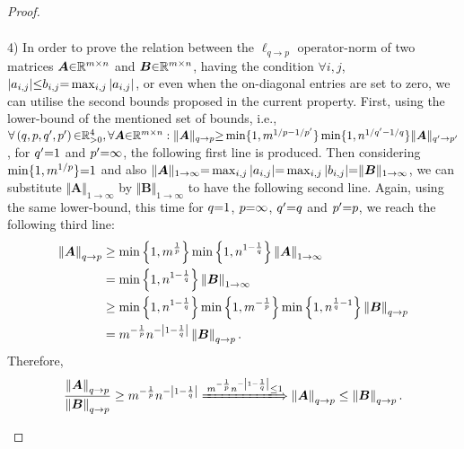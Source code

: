 \begin{proof}
\begin{itemize}
\begin{gather*}
\end{gather*}
4) In order to prove the relation between the $\ell_{q {\to} p}$ operator-norm of two matrices $\boldsymbol{A} {\in} \mathbb{R}^{m {\times} n}$ and $\boldsymbol{B} {\in} \mathbb{R}^{m {\times} n}$, having the condition $\forall i , j$, $|a_{i,j}| {\leq} b_{i,j} {=} \max_{i,j} |a_{i,j}|$, or even when the on-diagonal entries are set to zero, we can utilise the second bounds   proposed in the current property.
First, using the lower-bound of the mentioned set of bounds, i.e., $\forall \left( q , p , q' , p' \right) {\in} \mathbb{R}^4_{>0} , \forall \boldsymbol{A} {\in} \mathbb{R}^{m {\times} n} : \Vert \boldsymbol{A} \Vert_{q \to p} {\geq} \min \{1 , m^{1/p {-} 1/{p'}} \} \min \{1 , n^{1/{q'} {-} 1/q} \} \Vert \boldsymbol{A} \Vert_{q' \to p'}$, for $q' {=} 1$ and $p' {=} \infty$, the following first line is produced.
Then considering $\min \{ 1 , m^{1/p} \} {=} 1$ and also $\Vert \boldsymbol{A} \Vert_{1 \to \infty} {=} \max_{i,j} |a_{i,j}| {=} \max_{i,j} |b_{i,j}| {=} \Vert \boldsymbol{B} \Vert_{1 \to \infty}$, we can substitute $\Vert \boldsymbol{A} \Vert_{1 \to \infty}$ by $\Vert \boldsymbol{B} \Vert_{1 \to \infty}$ to have the following second line.
Again, using the same lower-bound, this time for $q {=} 1$, $p {=} \infty$, $q' {=} q$ and $p' {=} p$, we reach the following third line:
\begin{gather*}
\begin{aligned}
\left\lVert\boldsymbol{A}\right\rVert_{q \to p} &\geq 
\min \left\lbrace 1 , m^{\frac1p} \right\rbrace \min \left\lbrace 1 , n^{1 - \frac1q} \right\rbrace \left\lVert\boldsymbol{A}\right\rVert_{1 \to \infty} \\
&= \min \left\lbrace 1 , n^{1 - \frac1q} \right\rbrace \left\lVert\boldsymbol{B}\right\rVert_{1 \to \infty} \\
&\geq \min \left\lbrace 1 , n^{1 - \frac1q} \right\rbrace \min \left\lbrace 1 , m^{-\frac1p} \right\rbrace \min \left\lbrace 1 , n^{\frac1q - 1} \right\rbrace \left\lVert\boldsymbol{B}\right\rVert_{q \to p} \\
&= m^{-\frac1p} n^{-\left\lvert1 - \frac1q\right\rvert} \left\lVert\boldsymbol{B}\right\rVert_{q \to p}. \\
\end{aligned}
\end{gather*}
Therefore, 
\begin{gather*}
\begin{aligned}
\frac{\mynorm{\boldsymbol{A}}_{q \to p}}{\mynorm{\boldsymbol{B}}_{q \to p}} \geq m^{-\frac1p} n^{-\myabs{1 - \frac1q}} \xLongrightarrow{m^{-\frac1p} n^{-\myabs{1 - \frac1q}} \leq 1} \mynorm{\boldsymbol{A}}_{q \to p} \leq \mynorm{\boldsymbol{B}}_{q \to p}.
\end{aligned}
\end{gather*}


\end{itemize}
\end{proof}
